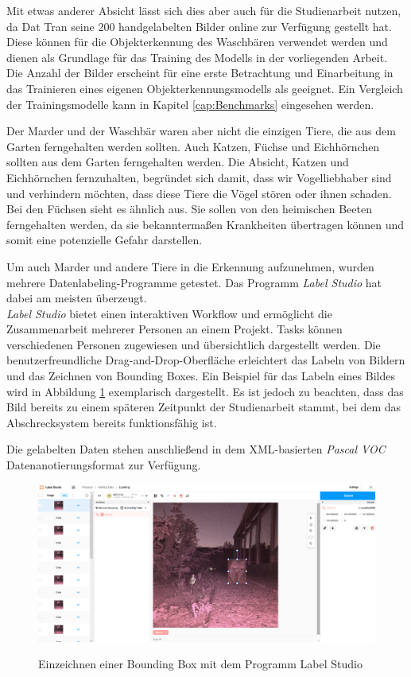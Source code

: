 Mit etwas anderer Absicht lässt sich dies aber auch für die Studienarbeit nutzen, da Dat Tran seine 200 handgelabelten Bilder online zur Verfügung gestellt hat. Diese können für die Objekterkennung des Waschbären verwendet werden und dienen als Grundlage für das Training des Modells in der vorliegenden Arbeit.\\
Die Anzahl der Bilder erscheint für eine erste Betrachtung und Einarbeitung in das Trainieren eines eigenen Objekterkennungsmodells als geeignet. Ein Vergleich der Trainingsmodelle kann in Kapitel \ref{cap:Benchmarks} eingesehen werden.

Der Marder und der Waschbär waren aber nicht die einzigen Tiere, die aus dem Garten ferngehalten werden sollten. Auch Katzen, Füchse und Eichhörnchen sollten aus dem Garten ferngehalten werden. Die Absicht, Katzen und Eichhörnchen fernzuhalten, begründet sich damit, dass wir Vogelliebhaber sind und verhindern möchten, dass diese Tiere die Vögel stören oder ihnen schaden.
\\
Bei den Füchsen sieht es ähnlich aus. Sie sollen von den heimischen Beeten ferngehalten werden, da sie bekanntermaßen Krankheiten übertragen können und somit eine potenzielle Gefahr darstellen.

Um auch Marder und andere Tiere in die Erkennung aufzunehmen, wurden mehrere Datenlabeling-Programme getestet. Das Programm \textit{Label Studio} hat dabei am meisten überzeugt.
\\
\textit{Label Studio} bietet einen interaktiven Workflow und ermöglicht die Zusammenarbeit mehrerer Personen an einem Projekt. Tasks können verschiedenen Personen zugewiesen und übersichtlich dargestellt werden. Die benutzerfreundliche Drag-and-Drop-Oberfläche erleichtert das Labeln von Bildern und das Zeichnen von Bounding Boxes. Ein Beispiel für das Labeln eines Bildes wird in Abbildung \ref{fig:label_studio} exemplarisch dargestellt. Es ist jedoch zu beachten, dass das Bild bereits zu einem späteren Zeitpunkt der Studienarbeit stammt, bei dem das Abschrecksystem bereits funktionsfähig ist. \cite{labelstudio}

Die gelabelten Daten stehen anschließend in dem XML-basierten \textit{Pascal VOC} Datenanotierungsformat zur Verfügung.

\begin{figure}[h]
    \centering
    \includegraphics[width=\textwidth]{images/label_studio.png}
    \label{fig:label_studio}
    \caption{Einzeichnen einer Bounding Box mit dem Programm Label Studio}
\end{figure}

